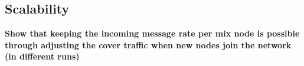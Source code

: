 \documentclass[a4paper,11pt,oneside]{report}
\begin{document}




\subsection{Scalability}
\textbf{Show that keeping the incoming message rate per mix node is possible through adjusting the cover traffic when new nodes join the network (in different runs)}

\end{document}
